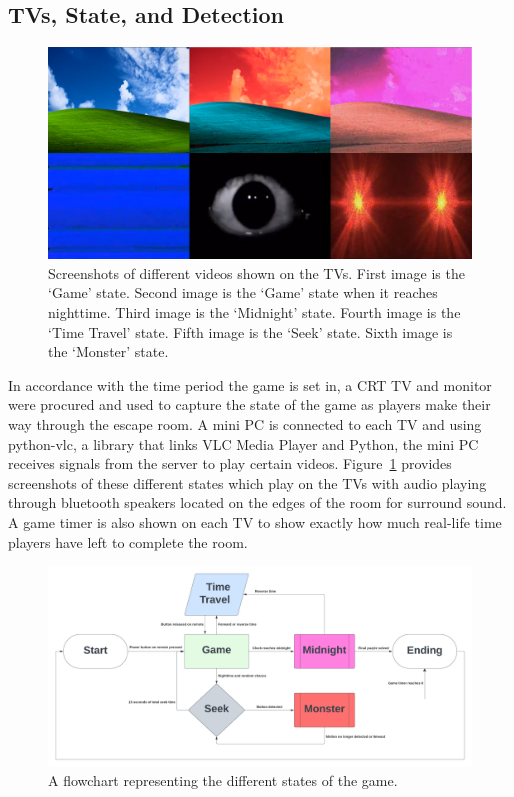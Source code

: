 \documentclass[conference]{IEEEtran}
\begin{document}
\subsection{TVs, State, and Detection} %

\begin{figure}[ht]
    \centering
    \includegraphics[width=0.90\columnwidth]{Images/TV_States.png}
    \caption{Screenshots of different videos shown on the TVs. First image is the `Game' state.
    Second image is the `Game' state when it reaches nighttime. Third image is the `Midnight' state. 
    Fourth image is the `Time Travel' state. Fifth image is the `Seek' state. Sixth image is the `Monster' state.}
    \label{fig:tv}
\end{figure}

\indent In accordance with the time period the game is set in, a CRT TV and monitor were procured and used to capture the state of the game
as players make their way through the escape room. A mini PC is connected to each TV and using python-vlc, a library that links VLC Media Player
and Python, the mini PC receives signals from the server to play certain videos. Figure~\ref{fig:tv} provides screenshots of these different states
which play on the TVs with audio playing through bluetooth speakers located on the edges of the room for surround sound. A game timer is also shown
on each TV to show exactly how much real-life time players have left to complete the room.

\begin{figure}[ht]
    \centering
    \includegraphics[width=0.90\columnwidth]{Images/state_flow.png}
    \caption{A flowchart representing the different states of the game.}
    \label{fig:pir}
\end{figure}
\end{document}
